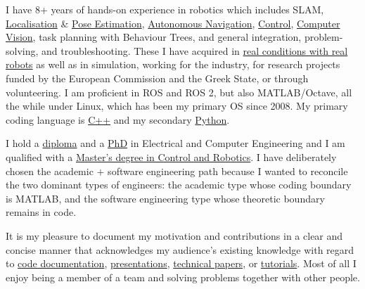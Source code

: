 \documentclass[a4paper,10pt,twoside]{article}
\begin{document}
\vspace{-0.5cm}
\begin{bw_box} \small
  \hspace{1em}I have 8+ years of hands-on experience in robotics which includes SLAM, \href{https://github.com/cbgl/cbgl}{Localisation} \& \href{https://github.com/fourier-scan-matcher/fsm-lo}{Pose Estimation},
  \href{https://link.springer.com/article/10.1007/s10846-019-01086-y}{Autonomous Navigation}, \href{https://www.tandfonline.com/doi/full/10.1080/00207179.2018.1514129}{Control},
  \href{https://github.com/li9i/pandora\_vision\_2014}{Computer Vision}, task planning with Behaviour Trees, and
  general integration, problem-solving, and troubleshooting. These I have acquired in \href{https://relief.web.auth.gr/\%CF\%81\%CE\%BF\%CE\%BC\%CF\%80\%CE\%BF\%CF\%84\%CE\%B9\%CE\%BA\%CE\%AC-\%CE\%BF\%CF\%87\%CE\%AE\%CE\%BC\%CE\%B1\%CF\%84\%CE\%B1/}{real
  conditions with real robots} as well as in simulation, working for the
  industry, for research projects funded by the European Commission and the Greek State, or through volunteering. I am proficient in ROS and ROS 2, but also MATLAB/Octave, all the while under Linux, which has been my primary OS since 2008. My
  primary coding language is \href{https://github.com/fourier-scan-matcher/fsm}{C++} and my
  secondary
  \href{https://github.com/cultureid-auth-ros-packages/cultureid-waypoints-following}{Python}.

  \hspace{1em}I hold a \href{https://ikee.lib.auth.gr/record/291560}{diploma} and a \href{https://www.didaktorika.gr/eadd/handle/10442/56399?locale=en}{PhD} in Electrical and Computer Engineering and I
  am qualified with a
  \href{http://kth.diva-portal.org/smash/record.jsf?pid=diva2\%3A1102597\&dswid=2875}{Master's degree in Control and Robotics}.
  I have deliberately chosen the academic $+$ software engineering path because I
  wanted to reconcile the two dominant types of engineers: the academic type
  whose coding boundary is MATLAB, and the software engineering type whose
  theoretic boundary remains in code.

  \hspace{1em}It is my pleasure to document my motivation and contributions in a clear and concise
  manner that acknowledges my audience's existing knowledge with regard to
  \href{https://github.com/li9i/pandora_vision_2014/blob/hydro-devel/pandora_vision_hole_detector/src/hole_fusion_node/hole_fusion.cpp}{code documentation},
  \href{https://www.youtube.com/watch?v=xaDKjI0WkDc}{presentations}, \href{https://ieeexplore.ieee.org/abstract/document/9981228}{technical papers},
  or \href{https://github.com/li9i/ros1_humble_bridge_template}{tutorials}. Most of all I enjoy being a member of a team and solving problems together with other people.
\end{bw_box}
\vfill
\end{document}
